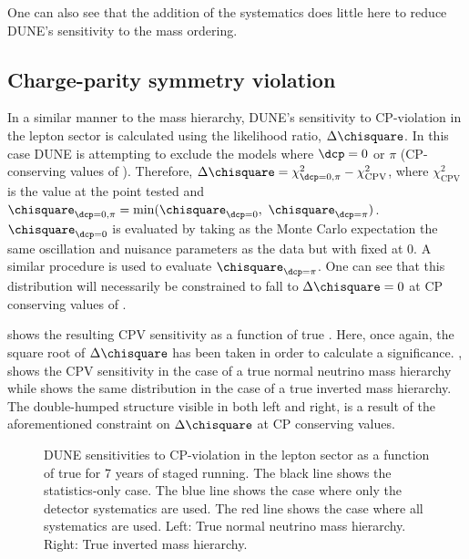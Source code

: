 One can also see that the addition of the systematics does little here to reduce DUNE's sensitivity to the mass ordering.

\subsection{Charge-parity symmetry violation}
\label{sec:dune_lbl:sensitivities:cpv}

In a similar manner to the mass hierarchy, DUNE's sensitivity to CP-violation in the lepton sector is calculated using the likelihood ratio, $\Delta \chisquare$.
In this case DUNE is attempting to exclude the models where $\dcp = 0$ or $\pi$ (CP-conserving values of \dcp).
Therefore, $\Delta \chisquare = \chi^{2}_{\dcp=0,\pi} - \chi^{2}_{\text{CPV}}$, where $\chi^{2}_{\text{CPV}}$ is the \chisquare value at the \dcp point tested and $\chisquare_{\dcp=0,\pi} = \min(\chisquare_{\dcp=0},~\chisquare_{\dcp=\pi})$.
$\chisquare_{\dcp=0}$ is evaluated by taking as the Monte Carlo expectation the same oscillation and nuisance parameters as the data but with \dcp fixed at 0.
A similar procedure is used to evaluate $\chisquare_{\dcp=\pi}$.
One can see that this distribution will necessarily be constrained to fall to $\Delta \chisquare = 0$ at CP conserving values of \dcp.

 shows the resulting CPV sensitivity as a function of true \dcp.
Here, once again, the square root of $\Delta\chisquare$ has been taken in order to calculate a significance.
, shows the CPV sensitivity in the case of a true normal neutrino mass hierarchy while  shows the same distribution in the case of a true inverted mass hierarchy.
The double-humped structure visible in both  left and right, is a result of the aforementioned constraint on $\Delta\chisquare$ at CP conserving values.

\begin{figure}[h]
	\begin{minipage}[t]{.5\linewidth}
		\begin{adjustbox}{max totalsize=\linewidth, center}
			
		\end{adjustbox}
	\end{minipage}
	\hfill
	\begin{minipage}[t]{.5\linewidth}
		\begin{adjustbox}{max totalsize=\linewidth, center}
			
		\end{adjustbox}
	\end{minipage}
	\caption[DUNE sensitivities to CP-violation in the lepton sector as a function of true \dcp.]{DUNE sensitivities to CP-violation in the lepton sector as a function of true \dcp for 7 years of staged running. The black line shows the statistics-only case. The blue line shows the case where only the detector systematics are used. The red line shows the case where all systematics are used. Left: True normal neutrino mass hierarchy. Right: True inverted mass hierarchy.}
	\label{fig:cpvSens}
\end{figure}

